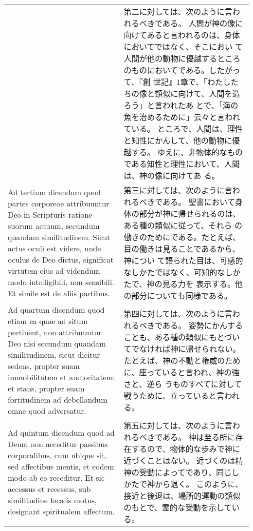 \documentclass[10pt]{jsarticle} %
\begin{document}
\begin{longtable}{p{21em}p{21em}}
&
第二に対しては、次のように言われるべきである。
人間が神の像に向けてあると言われるのは、身体においてではなく、そこにおい
 て人間が他の動物に優越するところのものにおいてである。したがって、『創
 世記』1章で、「わたしたちの像と類似に向けて、人間を造ろう」と言われたあ
 とで、「海の魚を治めるために」云々と言われている。
ところで、人間は、理性と知性にかんして、他の動物に優越する。
ゆえに、非物体的なものである知性と理性において、人間は、神の像に向けてあ
 る。

\\




Ad tertium dicendum quod partes corporeae
 attribuuntur Deo in Scripturis ratione suorum actuum, secundum quandam
 similitudinem. Sicut actus oculi est videre, unde oculus de Deo dictus,
 significat virtutem eius ad videndum modo intelligibili, non
 sensibili. Et simile est de aliis partibus.


&

第三に対しては、次のように言われるべきである。
聖書において身体の部分が神に帰せられるのは、ある種の類似に従って、それら
 の働きのためにである。たとえば、目の働きは見ることであるから、神につい
 て語られた目は、可感的なしかたではなく、可知的なしかたで、神の見る力を
 表示する。他の部分についても同様である。


\\



Ad quartum dicendum quod etiam ea quae ad
 situm pertinent, non attribuuntur Deo nisi secundum quandam
 similitudinem, sicut dicitur sedens, propter suam immobilitatem et
 auctoritatem; et stans, propter suam fortitudinem ad debellandum omne
 quod adversatur.


&

第四に対しては、次のように言われるべきである。
姿勢にかんすることも、ある種の類似にもとづいてでなければ神に帰せられない。
 たとえば、神の不動と権威のために、座っていると言われ、神の強さと、逆ら
 うものすべてに対して戦うために、立っていると言われる。

\\


Ad quintum dicendum quod ad Deum non acceditur
 passibus corporalibus, cum ubique sit, sed affectibus mentis, et eodem
 modo ab eo receditur. Et sic accessus et recessus, sub similitudine
 localis motus, designant spiritualem affectum.


&

第五に対しては、次のように言われるべきである。
神は至る所に存在するので、物体的な歩みで神に近づくことはない。
近づくのは精神の受動によってであり、同じしかたで神から退く。
このように、接近と後退は、場所的運動の類似のもとで、霊的な受動を示してい
 る。




\end{longtable}
\end{document}
